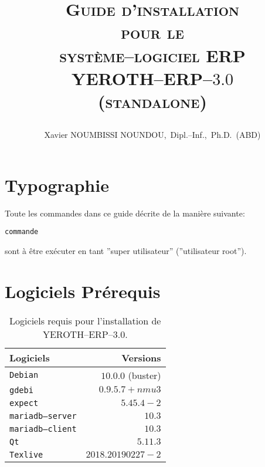 \documentclass[a4paper, 10pt]{article}
\newcommand{\texlive}{\texttt{Texlive}\xspace}
\newcommand{\gdebi}{\texttt{gdebi}\xspace}
\newcommand{\expect}{\texttt{expect}\xspace}
\newcommand{\debian}{\texttt{Debian}\xspace}
\newcommand{\qt}{\texttt{Qt}\xspace}
\newcommand{\mariadbserver}{\texttt{mariadb--server}\xspace}
\newcommand{\mariadbclient}{\texttt{mariadb--client}\xspace}
\newcommand{\yerotherptroiszero}{\textcolor{yerenColorBlue}{\sc YEROTH--ERP--$3.0$}\xspace}
\newcommand{\yerotherp}{\textcolor{yerenColorBlue}{\sc YEROTH--ERP--$3.0$}\xspace}
\newcommand{\erp}{syst\`eme--logiciel ERP\xspace}
\newcommand{\myfullacademicname}{Xavier NOUMBISSI NOUNDOU,~Dipl.--Inf.,~Ph.D.~(ABD)\xspace}
\newcommand{\rootcommand}[1]{
\begin{center}
\textcolor{purplish}{#1\xspace}
\end{center}}
\begin{document}

\title{
\vspace{-1.65em}
\textcolor{medgreen}{\textsc{Guide d'installation \\
										pour le \\
									 \erp \\ \vspace{1em}
									 \yerotherp \\ 
									 \hspace{0.6em} \textcolor{yerenColorBlue}{(standalone)} }}
									 \author{\myfullacademicname}
}

\date{} 
\maketitle
\thispagestyle{fancy}

\vspace{-0.5em}

{}
\begingroup
\tableofcontents
\endgroup


\vspace{0.25cm}

\section{Typographie}

Toute les commandes dans ce guide d\'ecrite
de la mani\`ere suivante:
	\begin{alltt}
		\rootcommand{commande}
	\end{alltt}
sont \`a \^etre ex\'ecuter en tant
''super utilisateur'' (''utilisateur root'').

\section{Logiciels Pr\'erequis}

\begin{table}[!htbp]
\centering
\begin{tabular}{l|r}
\textbf{Logiciels}	&
\textbf{Versions}	\\ \hline
\debian				&
$10.0.0$ (buster)	\\ \hline
\gdebi				&
$0.9.5.7+nmu3$		\\ \hline
\expect				&
$5.45.4-2$			\\ \hline
\mariadbserver		&
$10.3$				\\ \hline
\mariadbclient		&
$10.3$				\\ \hline
\qt					&
$5.11.3$			\\ \hline	
\texlive			&
$2018.20190227-2$	\\ 			
\end{tabular}
\caption{Logiciels requis pour l'installation de \yerotherptroiszero.}
\label{tab:dependance-logiciel}
\end{table}
\end{document}
